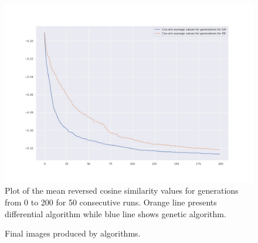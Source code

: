 \documentclass[12pt,a4paper,openany]{book}
\begin{document}
\begin{figure}[H]
    \centering
    \includegraphics[scale=0.45]{figs/avg_mean.jpg}
    \caption{Plot of the mean reversed cosine similarity values for generations from 0 to 200 for 50 consecutive runs. Orange line presents differential algorithm while blue line shows genetic algorithm.}\label{Fig:STYLEGAN}
\end{figure}

\begin{figure}[H]
    \centering
    \qquad
    \caption{Final images produced by algorithms.}%
    \label{fig:example}%
\end{figure}
\end{document}
